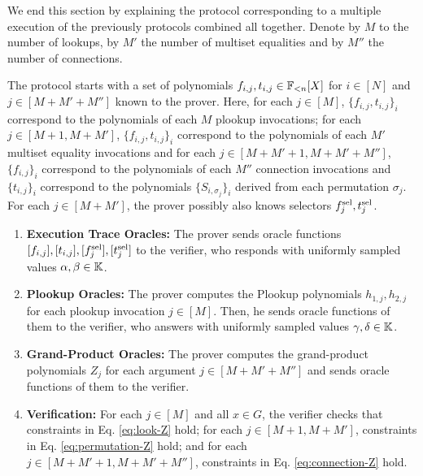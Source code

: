 We end this section by explaining the protocol corresponding to a multiple execution of the previously protocols combined all together. Denote by $M$ to the number of lookups, by $M'$ the number of multiset equalities and by $M''$ the number of connections. 
\begin{protocol}\label{prot:extended-plookup}
The protocol starts with a set of polynomials $f_{i,j},t_{i,j} \in \mathbb{F}_{<n}[X]$ for $i\in[N]$ and $j\in[M+M'+M'']$ known to the prover. Here, for each $j \in [M]$, $\{f_{i,j},t_{i,j}\}_i$ correspond to the polynomials of each $M$ plookup invocations; for each $j \in [M+1,M+M']$, $\{f_{i,j},t_{i,j}\}_i$ correspond to the polynomials of each $M'$ multiset equality invocations and for each $j \in [M+M'+1,M+M'+M'']$, $\{f_{i,j}\}_i$ correspond to the polynomials of each $M''$ connection invocations and $\{t_{i,j}\}_i$ correspond to the polynomials $\{S_{i,\sigma_{j}}\}_i$ derived from each permutation $\sigma_j$. For each $j \in [M+M']$, the prover possibly also knows selectors $f^{\text{sel}}_j,t^{\text{sel}}_j$.
\begin{enumerate}
  \item \textbf{Execution Trace Oracles:} The prover sends oracle functions $[f_{i,j}],[t_{i,j}],[f^{\text{sel}}_j],[t^{\text{sel}}_j]$ to the verifier, who responds with uniformly sampled values $\alpha,\beta \in \mathbb{K}$.
  \item \textbf{Plookup Oracles:} The prover computes the Plookup polynomials $h_{1,j},h_{2,j}$ for each plookup invocation $j \in [M]$. Then, he sends oracle functions of them to the verifier, who answers with uniformly sampled values $\gamma,\delta \in \mathbb{K}$.
  \item \textbf{Grand-Product Oracles:} The prover computes the grand-product polynomials $Z_j$ for each argument $j \in [M+M'+M'']$ and sends oracle functions of them to the verifier.
  \item \textbf{Verification:} For each $j \in [M]$ and all $x \in G$, the verifier checks that constraints in Eq. \eqref{eq:look-Z} hold; for each $j \in [M+1,M+M']$, constraints in Eq. \eqref{eq:permutation-Z} hold; and for each $j \in [M+M'+1,M+M'+M'']$, constraints in Eq. \eqref{eq:connection-Z} hold.
\end{enumerate}
\end{protocol}


